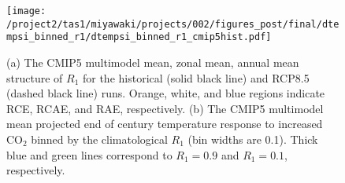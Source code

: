 \documentclass{ametsocV5}
\begin{document}
\begin{figure}
  \centering
  \noindent\texttt{[image: /project2/tas1/miyawaki/projects/002/figures\_post/final/dtempsi\_binned\_r1/dtempsi\_binned\_r1\_cmip5hist.pdf]}
  \caption{(a) The CMIP5 multimodel mean, zonal mean, annual mean structure of $R_1$ for the historical (solid black line) and RCP8.5 (dashed black line) runs. Orange, white, and blue regions indicate RCE, RCAE, and RAE, respectively. (b) The CMIP5 multimodel mean projected end of century temperature response to increased CO$_2$ binned by the climatological $R_1$ (bin widths are 0.1). Thick blue and green lines correspond to $R_1=0.9$  and $R_1=0.1$, respectively.}
  \label{fig:cmip5-r1-ann-rcp}
\end{figure}


\end{document}
